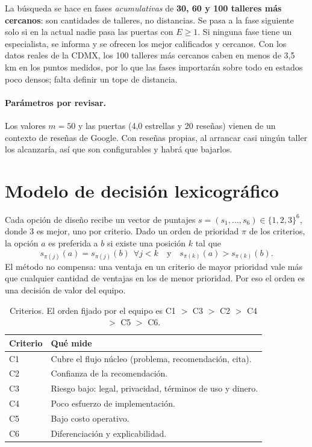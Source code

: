 \documentclass[11pt,a4paper]{article}
\begin{document}
La búsqueda se hace en fases \emph{acumulativas} de \textbf{30, 60 y 100 talleres más cercanos}:
son cantidades de talleres, no distancias. Se pasa a la fase siguiente solo si en la actual nadie
pasa las puertas con $E\ge 1$. Si ninguna fase tiene un especialista, se informa y se ofrecen los
mejor calificados y cercanos. Con los datos reales de la CDMX, los 100 talleres más cercanos
caben en menos de 3,5 km en los puntos medidos, por lo que las fases importarán sobre todo en
estados poco densos; falta definir un tope de distancia.

\paragraph{Parámetros por revisar.} Los valores $m=50$ y las puertas (4,0 estrellas y 20 reseñas)
vienen de un contexto de reseñas de Google. Con reseñas propias, al arrancar casi ningún taller los
alcanzaría, así que son configurables y habrá que bajarlos.

\section{Modelo de decisión lexicográfico}

Cada opción de diseño recibe un vector de puntajes $s=(s_1,\dots,s_6)\in\{1,2,3\}^6$, donde 3 es mejor,
uno por criterio. Dado un orden de prioridad $\pi$ de los criterios, la opción $a$ es preferida a $b$ si
existe una posición $k$ tal que
\begin{equation}
s_{\pi(j)}(a) = s_{\pi(j)}(b)\ \ \forall j<k
\quad\text{y}\quad
s_{\pi(k)}(a) > s_{\pi(k)}(b).
\end{equation}
El método no compensa: una ventaja en un criterio de mayor prioridad vale más que cualquier cantidad
de ventajas en los de menor prioridad. Por eso el orden es una decisión de valor del equipo.

\begin{table}[h]
\centering
\begin{tabularx}{\textwidth}{@{}l Y@{}}
\toprule
Criterio & Qué mide \\
\midrule
C1 & Cubre el flujo núcleo (problema, recomendación, cita). \\
C2 & Confianza de la recomendación. \\
C3 & Riesgo bajo: legal, privacidad, términos de uso y dinero. \\
C4 & Poco esfuerzo de implementación. \\
C5 & Bajo costo operativo. \\
C6 & Diferenciación y explicabilidad. \\
\bottomrule
\end{tabularx}
\caption{Criterios. El orden fijado por el equipo es C1 $>$ C3 $>$ C2 $>$ C4 $>$ C5 $>$ C6.}
\end{table}
\end{document}
